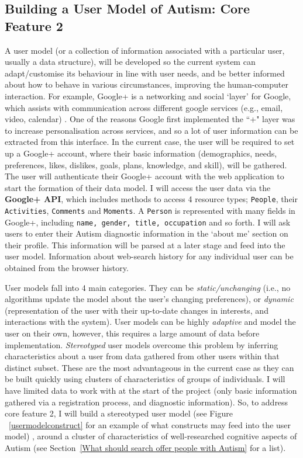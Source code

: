 \documentclass[a4paper, 11pt]{article}
\begin{document}
\begin{justify}
\subsection {Building a User Model of Autism: Core Feature 2}\label{usermodel}
A user model (or a collection of information associated with a particular user, usually a data structure), will be developed so the current system can adapt/customise its behaviour in line with user needs, and be better informed about how to behave in various circumstances, improving the human-computer interaction. For example, Google+ is a networking and social `layer' for Google, which assists with communication across different google services (e.g., email, video, calendar) \cite{gplus}. One of the reasons Google first implemented the ``+" layer was to increase personalisation across services, and so a lot of user information can be extracted from this interface. In the current case, the user will be required to set up a Google+ account, where their basic information (demographics, needs, preferences, likes, dislikes, goals, plans, knowledge, and skill), will be gathered. The user will authenticate their Google+ account with the web application to start the formation of their data model. I will access the user data via the \textbf{Google+ API}, which includes methods to access 4 resource  types; \texttt{People}, their \texttt{Activities}, \texttt{Comments} and \texttt{Moments}. A \texttt{Person} is represented with many fields in Google+, including \texttt{name, gender, title, occupation} and so forth. I will ask users to enter their Autism diagnostic information in the `about me' section on their profile. This information will be parsed at a later stage and feed into the user model. Information about web-search history for any individual user can be obtained from the browser history. 

User models fall into 4 main categories. They can be \textit{static/unchanging} (i.e., no algorithms update the model about the user's changing preferences), or \textit{dynamic} (representation of the user with their up-to-date changes in interests, and interactions with the system). User models can be highly \textit{adaptive} and model the user on their own, however, this requires a large amount of data before implementation. \textit{Stereotyped} user models overcome this problem by inferring characteristics about a user from data gathered from other users within that distinct subset. These are the most advantageous in the current case as they can be built quickly using clusters of characteristics of groups of individuals. I will have limited data to work with at the start of the project (only basic information gathered via a registration process, and diagnostic information). So, to address core feature 2, I will build a stereotyped user model (see Figure ~\ref{usermodelconstruct} for an example of what constructs may feed into the user model) , around a cluster of characteristics of well-researched cognitive aspects of Autism (see Section~\ref{What should search offer people with Autism} for a list).



\end{justify}
\end{document}
